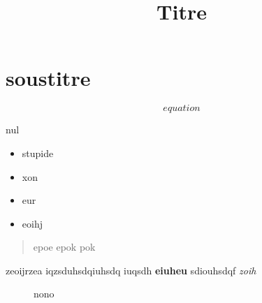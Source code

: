 \documentclass{article}
\begin{document}
\title{Titre}

\maketitle



\section{soustitre}


\[ equation \]


nul


\begin{itemize}

  \item stupide

  \item xon

  \item eur

  \item eoihj

\end{itemize}


\begin{quotation}
epoe
epok
pok
\end{quotation}


zeoijrzea iqzsduhsdqiuhsdq iuqsdh \textbf{eiuheu} sdiouhsdqf \emph{zoih}


\begin{figure}
nono
\end{figure}
\end{document}
